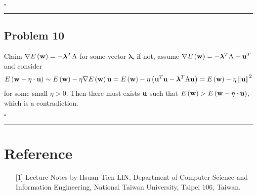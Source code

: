 \documentclass[12pt]{article}
\newcommand*{\QEDB}{\hfill\ensuremath{\square}}
\newcommand{\ParTh}[1]{\left(#1\right)}
\newcommand{\BF}[1]{{\bf#1}}
\newcommand{\Inverse}[1]{{#1}^{-1}}
\newcommand{\VecAbsVal}[1]{\left\|#1\right\|}
\newcommand{\horrule}[1]{\rule{\linewidth}{#1}}
\begin{document}
\QEDB

\horrule{0.5pt}

\subsection*{Problem 10}

\begin{comment}
Consider $\nabla\ParTh{E\ParTh{\BF{w}}-\bm{\lambda}^T\ParTh{A\BF{w}+\BF{b}}}=\BF{0}$,
\begin{align}
\left.
\begin{array}{r}
\partial_{\BF{w}}E\ParTh{\BF{w}}-\bm{\lambda}^TA=\BF{0}\\
A\BF{w}+\BF{b}=\BF{0}
\end{array}
\right\}
\Rightarrow\nabla E\ParTh{\BF{w}}-\bm{\lambda}^TA=\BF{0}\text{ at }\BF{w}=\Inverse{A}\BF{b}
\end{align}
where $\partial_{\bm{\lambda}}E\ParTh{\BF{w}}=\BF{0}$.
\end{comment}
Claim $\nabla E\ParTh{\BF{w}}=-\bm{\lambda}^T\text{A}$ for some vector $\bm{\lambda}$, if not, assume $\nabla E\ParTh{\BF{w}}=-\bm{\lambda}^T\text{A}+\BF{u}^T$ and consider
\begin{align}
E\ParTh{\BF{w}-\eta\cdot\BF{u}}\sim E\ParTh{\BF{w}}-\eta\nabla E\ParTh{\BF{w}}\BF{u}=E\ParTh{\BF{w}}-\eta\ParTh{\BF{u}^T\BF{u}-\bm{\lambda}^T\text{A}\BF{u}}=E\ParTh{\BF{w}}-\eta\VecAbsVal{\BF{u}}^2
\end{align}
for some small $\eta>0$. Then there must exists $\BF{u}$ such that $E\ParTh{\BF{w}}>E\ParTh{\BF{w}-\eta\cdot\BF{u}}$, which is a contradiction.

\QEDB

\horrule{0.5pt}

\section*{Reference}

\begin{enumerate}

\item[{[1]}] Lecture Notes by Hsuan-Tien LIN, Department of Computer Science and Information Engineering, National Taiwan University, Taipei 106, Taiwan.

\end{enumerate}

\end{document}
